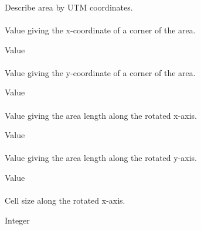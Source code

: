 \subsubsection{}
 \slist
   \item \Description Describe area by UTM coordinates.
   \item \Argument
   \item \Default
 \elist

\paragraph{}
 \slist
   \item \Description Value giving the x-coordinate of a corner of the area.
   \item \Argument Value
   \item \Default
 \elist

\paragraph{}
 \slist
   \item \Description Value giving the y-coordinate of a corner of the area.
   \item \Argument Value
   \item \Default
 \elist

\paragraph{}
 \slist
   \item \Description Value giving the area length along the rotated x-axis.
   \item \Argument Value
   \item \Default
 \elist

\paragraph{}
 \slist
   \item \Description Value giving the area length along the rotated y-axis.
   \item \Argument Value
   \item \Default
 \elist

\paragraph{}
 \slist
   \item \Description Cell size along the rotated x-axis.
   \item \Argument Integer
   \item \Default
 \elist

